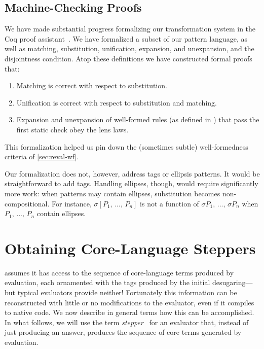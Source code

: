 \subsection{Machine-Checking Proofs}
\label{sec:reval-coq}

We have made substantial progress formalizing our transformation system in
the Coq proof assistant~\cite{coq-manual}. We have formalized a subset of
our pattern language, as well as matching, substitution, unification,
expansion, and unexpansion, and the disjointness condition. Atop these
definitions we have constructed formal proofs that:
\begin{enumerate}
\item Matching is correct with respect to substitution.
\item Unification is correct with respect to substitution and matching.
\item Expansion and unexpansion of well-formed rules (as defined in
  ) that pass the first static check obey the
  lens laws.
\end{enumerate}
This formalization helped us pin down the (sometimes subtle)
well-formedness criteria of \cref{sec:reval-wf}.

Our formalization does not, however, address tags or ellipsis patterns.
It would be straightforward to add tags. Handling ellipses, though, would
require significantly more work: when patterns may contain ellipses,
substitution becomes non-compositional. For instance, $\sigma
[P_1,\,...,\,P_n]$ is not a function of $\sigma P_1,\,...,\,\sigma P_n$
when $P_1,\,...,\,P_n$ contain ellipses.



\section{Obtaining Core-Language Steppers}
\label{sec:reval-lang}


{\Resugarer} assumes it has access to the sequence of core-language terms
produced by evaluation, each ornamented with the tags produced by the
initial desugaring---but typical evaluators provide neither!
Fortunately this information can be reconstructed with little or no
modifications to the evaluator, even if it compiles to native code. We now
describe in general terms how this can be accomplished.  In what follows,
we will use the term \emph{stepper}~\cite{racket-stepper} for an
evaluator that, instead of just producing an answer, produces
the sequence of core terms generated by evaluation.

